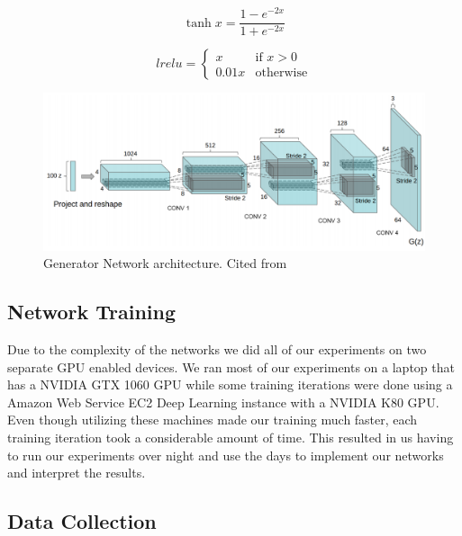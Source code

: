 \begin{equation}
\label{tanh-equation}
\tanh x = \frac{1 - e^{-2x}}{1 + e^{-2x}}
\end{equation}

\begin{equation}
\label{lrelu-equation}
       lrelu = 
        \begin{cases}
            x & \text{if $x > 0$} \\
            0.01x & \text{otherwise}
        \end{cases}
\end{equation}


\begin{figure}[h]
\centering
\includegraphics[width=\textwidth]{figures/DCGAN.png}
\caption{Generator Network architecture. Cited from \cite{DBLP:journals/corr/RadfordMC15} }
\label{fig:architecture}
\end{figure}

\subsection{Network Training}
Due to the complexity of the networks we did all of our experiments on two separate GPU enabled devices. We ran most of our experiments on a laptop that has a NVIDIA GTX 1060 GPU while some training iterations were done using a Amazon Web Service EC2 Deep Learning instance with a NVIDIA K80 GPU. Even though utilizing these machines made our training much faster, each training iteration took a considerable amount of time. This resulted in us having to run our experiments over night and use the days to implement our networks and interpret the results. 

\subsection{Data Collection}

